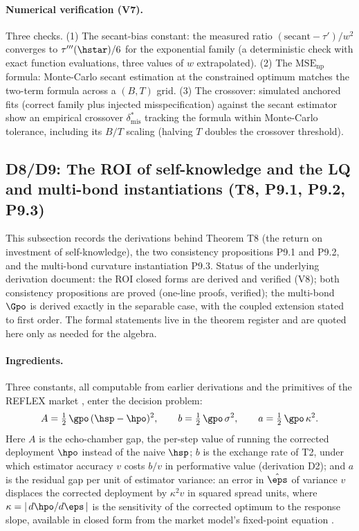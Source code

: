 \paragraph{Numerical verification (V7).}
Three checks. (1) The secant-bias constant: the measured ratio
$(\text{secant} - \tau')/w^2$ converges to $\tau'''(\hstar)/6$ for the
exponential family (a deterministic check with exact function evaluations,
three values of $w$ extrapolated). (2) The $\mathrm{MSE}_{\mathrm{np}}$
formula: Monte-Carlo secant estimation at the constrained optimum matches
the two-term formula across a $(B, T)$ grid. (3) The crossover: simulated
anchored fits (correct family plus injected misspecification) against the
secant estimator show an empirical crossover $\delta_{\mathrm{mis}}^{*}$
tracking the formula within Monte-Carlo tolerance, including its $B/T$
scaling (halving $T$ doubles the crossover threshold).

\subsection*{D8/D9: The ROI of self-knowledge and the LQ and multi-bond instantiations (T8, P9.1, P9.2, P9.3)}

This subsection records the derivations behind Theorem T8 (the return on
investment of self-knowledge), the two consistency propositions P9.1 and
P9.2, and the multi-bond curvature instantiation P9.3. Status of the
underlying derivation document: the ROI closed forms are derived and
verified (V8); both consistency propositions are proved (one-line proofs,
verified); the multi-bond $\Gpo$ is derived exactly in the separable case,
with the coupled extension stated to first order. The formal statements
live in the theorem register and are quoted here only as needed for the
algebra.

\paragraph{Ingredients.}
Three constants, all computable from earlier derivations and the
primitives of the REFLEX market \citep{reflex2026}, enter the decision
problem:
\begin{equation*}
A = \tfrac{1}{2}\,\gpo\,(\hsp - \hpo)^2, \qquad
b = \tfrac{1}{2}\,\gpo\,\sigma^2, \qquad
a = \tfrac{1}{2}\,\gpo\,\kappa^2 .
\end{equation*}
Here $A$ is the echo-chamber gap, the per-step value of
running the corrected deployment $\hpo$ instead of the naive $\hsp$;
$b$ is the exchange rate of T2, under
which estimator accuracy $v$ costs $b/v$ in performative value
(derivation D2); and $a$ is the residual gap per unit of estimator
variance: an error in $\hat\eps$ of variance $v$ displaces the corrected
deployment by $\kappa^2 v$ in squared spread units, where
$\kappa = |\,d\hpo/d\eps\,|$ is the sensitivity of the
corrected optimum to the response slope, available in closed form from
the market model's fixed-point equation \citep{reflex2026}.

